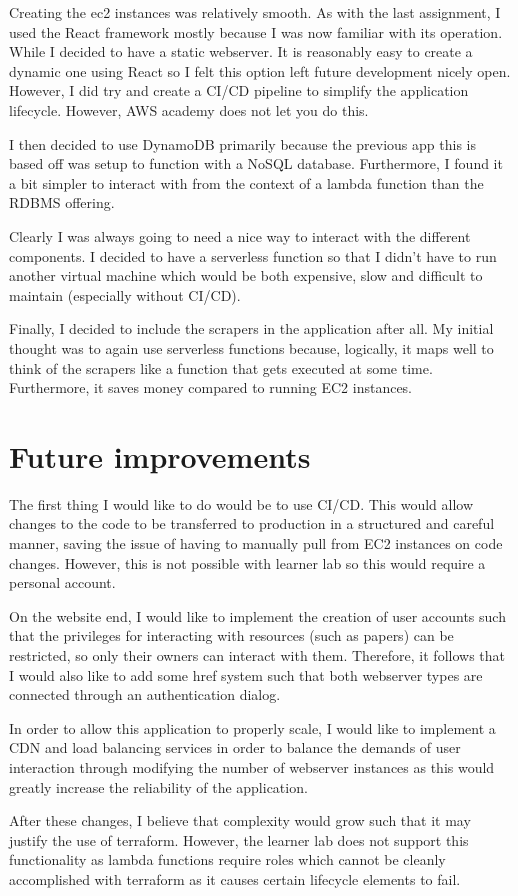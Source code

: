 \documentclass[12pt]{article}
\begin{document}
Creating the ec2 instances was relatively smooth. As with the last assignment, I used the React framework mostly because I was now familiar with its operation. While I decided to have a static webserver. It is reasonably easy to create a dynamic one using React so I felt this option left future development nicely open.
However, I did try and create a CI/CD pipeline to simplify the application lifecycle. However, AWS academy does not let you do this.

I then decided to use DynamoDB primarily because the previous app this is based off was setup to function with a NoSQL database. Furthermore, I found it a bit simpler to interact with from the context of a lambda function than the RDBMS offering.

Clearly I was always going to need a nice way to interact with the different components. I decided to have a serverless function so that I didn't have to run another virtual machine which would be both expensive, slow and difficult to maintain (especially without CI/CD).

Finally, I decided to include the scrapers in the application after all. My initial thought was to again use serverless functions because, logically, it maps well to think of the scrapers like a function that gets executed at some time. Furthermore, it saves money compared to running EC2 instances.


\section{Future improvements}

The first thing I would like to do would be to use CI/CD. This would allow changes to the code to be transferred to production in a structured and careful manner, saving the issue of having to manually pull from EC2 instances on code changes. However, this is not possible with learner lab so this would require a personal account.

On the website end, I would like to implement the creation of user accounts such that the privileges for interacting with resources (such as papers) can be restricted, so only their owners can interact with them. Therefore, it follows that I would also like to add some href system such that both webserver types are connected through an authentication dialog. 

In order to allow this application to properly scale, I would like to implement a CDN and load balancing services in order to balance the demands of user interaction through modifying the number of webserver instances as this would greatly increase the reliability of the application. 

After these changes, I believe that complexity would grow such that it may justify the use of terraform. However, the learner lab does not support this functionality as lambda functions require roles which cannot be cleanly accomplished with terraform as it causes certain lifecycle elements to fail. 
\end{document}
